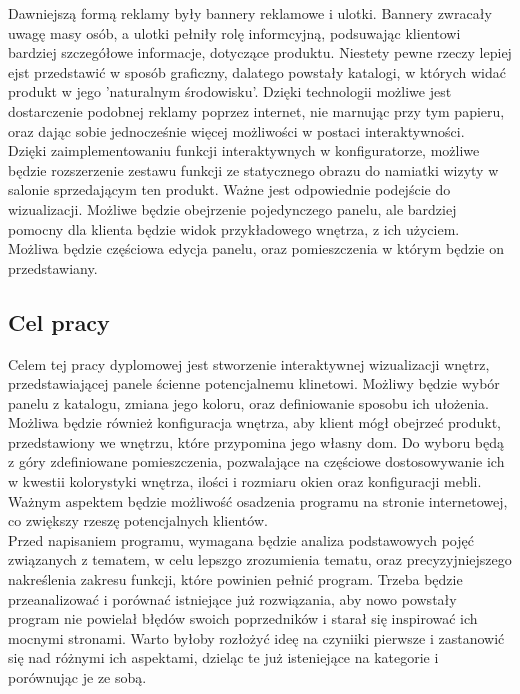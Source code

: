 \documentclass{article} %
\begin{document}
Dawniejszą formą reklamy były bannery reklamowe i ulotki. Bannery zwracały uwagę masy osób, a ulotki pełniły rolę informcyjną, podsuwając klientowi bardziej szczegółowe informacje, dotyczące produktu. Niestety pewne rzeczy lepiej ejst przedstawić w sposób graficzny, dalatego powstały katalogi, w których widać produkt w jego 'naturalnym środowisku'. Dzięki technologii możliwe jest dostarczenie podobnej reklamy poprzez internet, nie marnując przy tym papieru, oraz dając sobie jednocześnie więcej możliwości w postaci interaktywności.
\\

Dzięki zaimplementowaniu funkcji interaktywnych w konfiguratorze, możliwe będzie rozszerzenie zestawu funkcji ze statycznego obrazu do namiatki wizyty w salonie sprzedającym ten produkt. Ważne jest odpowiednie podejście do wizualizacji. Możliwe będzie obejrzenie pojedynczego panelu, ale bardziej pomocny dla klienta będzie widok przykładowego wnętrza, z ich użyciem. Możliwa będzie częściowa edycja panelu, oraz pomieszczenia w którym będzie on przedstawiany.
\\


    \subsection{Cel pracy}
Celem tej pracy dyplomowej jest stworzenie interaktywnej wizualizacji wnętrz, przedstawiającej panele ścienne potencjalnemu klinetowi. Możliwy będzie wybór panelu z katalogu, zmiana jego koloru, oraz definiowanie sposobu ich ułożenia. Możliwa będzie również konfiguracja wnętrza, aby klient mógł obejrzeć produkt, przedstawiony we wnętrzu, które przypomina jego własny dom. Do wyboru będą z góry zdefiniowane pomieszczenia, pozwalające na częściowe dostosowywanie ich w kwestii kolorystyki wnętrza, ilości i rozmiaru okien oraz konfiguracji mebli. Ważnym aspektem będzie możliwość osadzenia programu na stronie internetowej, co zwiększy rzeszę potencjalnych klientów.
\\

Przed napisaniem programu, wymagana będzie analiza podstawowych pojęć związanych z tematem, w celu lepszgo zrozumienia tematu, oraz precyzyjniejszego nakreślenia zakresu funkcji, które powinien pełnić program. Trzeba będzie przeanalizować i porównać istniejące już rozwiązania, aby nowo powstały program nie powielał błędów swoich poprzedników i starał się inspirować ich mocnymi stronami. Warto byłoby rozłożyć ideę na czyniiki pierwsze i zastanowić się nad różnymi ich aspektami, dzieląc te już isteniejące na kategorie i porównując je ze sobą.
\\
\end{document}
